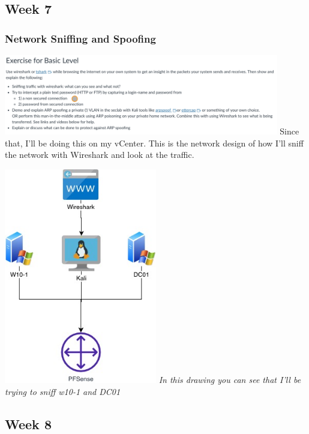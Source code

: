 \documentclass[12pt, letterpaper]{article}
\begin{document}
\subsection{Week 7}
\subsubsection{Network Sniffing and Spoofing}
\includegraphics[width=0.9\textwidth]{fotos/Week 7/Network Sniffing and Spoofing/Basic.jpeg}
\hfill\break
\hfill\break
Since that, I'll be doing this on my vCenter. This is the network design of how I'll sniff the network with Wireshark and look at the traffic.

\hfill\break
\hfill\break
\includegraphics[width=0.5\textwidth]{fotos/Week 7/Network Sniffing and Spoofing/Week 7 network sniffing.jpg}
\break
\emph{In this drawing you can see that I'll be trying to sniff w10-1 and DC01}
\newpage
\subsection{Week 8}
\end{document}
